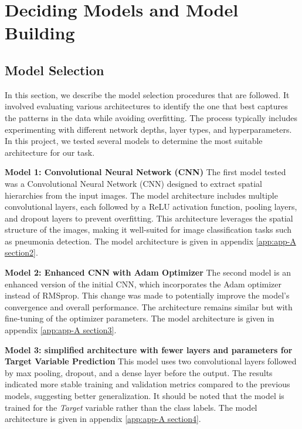 \chapter{Deciding Models and Model Building}
\label{cha:chapter 3}

\section{Model Selection}
\label{sec:chap3 section 1}

In this section, we describe the model selection procedures that are followed. It involved evaluating various architectures to identify the one that best captures the patterns in the data while avoiding overfitting. The process typically includes experimenting with different network depths, layer types, and hyperparameters. In this project, we tested several models to determine the most suitable architecture for our task.

\textbf{Model 1: Convolutional Neural Network (CNN)}
The first model tested was a Convolutional Neural Network (CNN) designed to extract spatial hierarchies from the input images. The model architecture includes multiple convolutional layers, each followed by a ReLU activation function, pooling layers, and dropout layers to prevent overfitting. This architecture leverages the spatial structure of the images, making it well-suited for image classification tasks such as pneumonia detection. The model architecture is given in appendix \ref{app:app-A section2}.

\textbf{Model 2: Enhanced CNN with Adam Optimizer}
The second model is an enhanced version of the initial CNN, which incorporates the Adam optimizer instead of RMSprop. This change was made to potentially improve the model's convergence and overall performance. The architecture remains similar but with fine-tuning of the optimizer parameters. The model architecture is given in appendix \ref{app:app-A section3}.

\textbf{Model 3:  simplified architecture with fewer layers and parameters for Target Variable Prediction}
This model uses two convolutional layers followed by max pooling, dropout, and a dense layer before the output. The results indicated more stable training and validation metrics compared to the previous models, suggesting better generalization. It should be noted that the model is trained for the \emph{Target} variable rather than the class labels. The model architecture is given in appendix \ref{app:app-A section4}.

